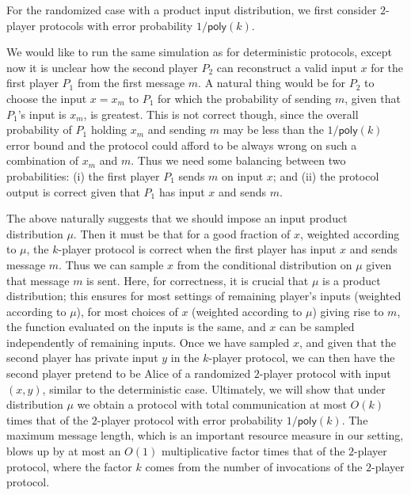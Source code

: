 \documentclass[11pt]{article}
\numberwithin{equation}{section}
\theoremstyle{definition}
\theoremstyle{plain}
\newcommand{\poly}{\mathsf{poly}}
\newcommand{\bigo}[1]{\ensuremath{{{O} \left( {#1} \right)}}}
\begin{document}
For the randomized case with a product input distribution, we first consider $2$-player protocols with error probability $1/\poly(k)$. 

We would like to run the same simulation as for deterministic protocols, 
except now it is unclear how the second player $P_2$ can reconstruct a valid input $x$ for the first player $P_1$ from the first message $m$. 
A natural thing would be for $P_2$
to choose the input $x=x_m$ to $P_1$ for which the probability
of sending $m$, given that $P_1$'s input is $x_m$, is greatest. 
This is not correct though, since the overall probability of $P_1$ holding $x_m$ and sending $m$ may be less than the $1/\poly(k)$ error bound  
and the protocol could afford to be always wrong on such a combination of $x_m$ and $m$.
Thus we need some balancing between two probabilities:  
%
(i) %
the first player $P_1$ sends $m$ on input $x$;
and %
(ii)  %
%
%
the protocol output is correct 
given that $P_1$ 
has input $x$ and sends $m$. 

The above naturally suggests that we should impose an
input product distribution $\mu$. Then it must be that for a good
fraction of $x$, weighted according to $\mu$,
the $k$-player protocol is correct when the first player has input $x$ and sends message $m$. 
Thus we can sample $x$ from the conditional distribution on $\mu$
given that message $m$ is sent. Here, for correctness, it is crucial
that $\mu$ is a product distribution; this ensures for most settings of
remaining player's inputs (weighted according to $\mu$), for most choices
of $x$ (weighted according to $\mu$) giving rise to $m$, the function evaluated on the inputs is the same, and $x$ can be sampled independently of remaining inputs. 
Once we have sampled $x$, and given that the second player has private input $y$ in the $k$-player protocol, we can then have
the second player pretend to be Alice of a randomized $2$-player
protocol with input $(x,y)$, similar to the deterministic case. 
Ultimately,  
we will show that under distribution $\mu$ we obtain a protocol with
total communication at most $\bigo{k}$ times that of the 
$2$-player protocol with error probability $1/\poly(k)$. The maximum message length, which is an important resource measure in our setting, blows up by at most an $\bigo{1}$ multiplicative factor times that of the $2$-player
protocol, 
where the factor $k$ comes from 
the number of invocations of the $2$-player protocol. 
\end{document}
